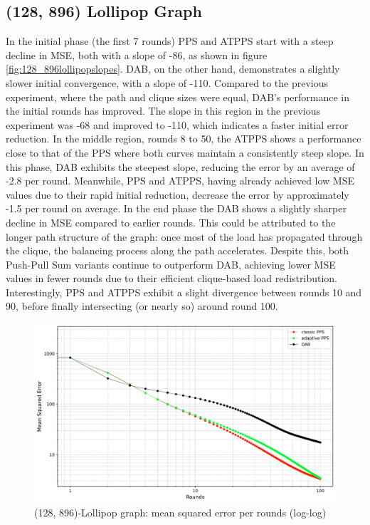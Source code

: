 \subsection{(128, 896) Lollipop Graph}\label{subsec:128_896lollipop}
In the initial phase (the first 7 rounds) PPS and ATPPS start with a steep decline in MSE, both with a slope of -86, as shown in figure \ref{fig:128_896lollipopslopes}. DAB, on the other hand, demonstrates a slightly slower initial convergence, with a slope of -110. Compared to the previous experiment, where the path and clique sizes were equal, DAB's performance in the initial rounds has improved. The slope in this region in the previous experiment was -68 and improved to -110, which indicates a faster initial error reduction. In the middle region, rounds 8 to 50, the ATPPS shows a performance close to that of the PPS where both curves maintain a consistently steep slope. In this phase, DAB exhibits the steepest slope, reducing the error by an average of -2.8 per round. Meanwhile, PPS and ATPPS, having already achieved low MSE values due to their rapid initial reduction, decrease the error by approximately -1.5 per round on average. In the end phase the DAB shows a slightly sharper decline in MSE compared to earlier rounds. This could be attributed to the longer path structure of the graph: once most of the load has propagated through the clique, the balancing process along the path accelerates. Despite this, both Push-Pull Sum variants continue to outperform DAB, achieving lower MSE values in fewer rounds due to their efficient clique-based load redistribution. Interestingly, PPS and ATPPS exhibit a slight divergence between rounds 10 and 90, before finally intersecting (or nearly so) around round 100.

\begin{figure}[]
    \centering
    \includegraphics[width=\linewidth]{figures/Simulation_outcomes/LollipopGraph/128_896/DAB_vs_PPS_LG_r100_n1024_averaged_loglog.png}
    \caption{(128, 896)-Lollipop graph: mean squared error per rounds (log-log)}
    \label{fig:128_896lollipopgraphMSEperRoundLogLog}
\end{figure}

